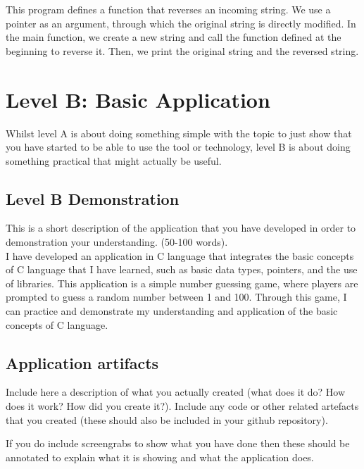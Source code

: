 \documentclass[a4paper, 11pt]{report}
\begin{document}
This program defines a function that reverses an incoming string. We use a pointer as an argument, through which the original string is directly modified. In the main function, we create a new string and call the function defined at the beginning to reverse it. Then, we print the original string and the reversed string.\\



\newpage
\section{Level B: Basic Application}

Whilst level A is about doing something simple with the topic to just show that you have started to be able to use the tool or technology, level B is about doing something practical that might actually be useful.

\subsection{Level B Demonstration}

This is a short description of the application that you have developed in order to demonstration your understanding. (50-100 words).\\

I have developed an application in C language that integrates the basic concepts of C language that I have learned, such as basic data types, pointers, and the use of libraries. This application is a simple number guessing game, where players are prompted to guess a random number between 1 and 100. Through this game, I can practice and demonstrate my understanding and application of the basic concepts of C language.\\

\subsection{Application artifacts}

Include here a description of what you actually created (what does it do? How does it work? How did you create it?). Include any code or other related artefacts that you created (these should also be included in your github repository).

If you do include screengrabs to show what you have done then these should be annotated to explain what it is showing and what the application does.\\
\end{document}
